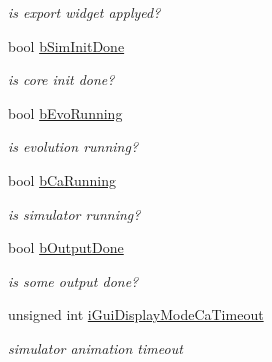 \begin{DoxyCompactItemize}
\begin{DoxyCompactList}\small\item\em is export widget applyed? \item\end{DoxyCompactList}\item 
\hypertarget{classCWindowMain_a9fb2c8acfb8cef14443738ebc7a57e40}{
bool \hyperlink{classCWindowMain_a9fb2c8acfb8cef14443738ebc7a57e40}{bSimInitDone}}
\label{classCWindowMain_a9fb2c8acfb8cef14443738ebc7a57e40}

\begin{DoxyCompactList}\small\item\em is core init done? \item\end{DoxyCompactList}\item 
\hypertarget{classCWindowMain_ab2f7ecd4403800b1ac1480a892c1f09e}{
bool \hyperlink{classCWindowMain_ab2f7ecd4403800b1ac1480a892c1f09e}{bEvoRunning}}
\label{classCWindowMain_ab2f7ecd4403800b1ac1480a892c1f09e}

\begin{DoxyCompactList}\small\item\em is evolution running? \item\end{DoxyCompactList}\item 
\hypertarget{classCWindowMain_a7f198e5218f09c31a2ee2da405a69482}{
bool \hyperlink{classCWindowMain_a7f198e5218f09c31a2ee2da405a69482}{bCaRunning}}
\label{classCWindowMain_a7f198e5218f09c31a2ee2da405a69482}

\begin{DoxyCompactList}\small\item\em is simulator running? \item\end{DoxyCompactList}\item 
\hypertarget{classCWindowMain_a67bdd53e50e369c7cc3831e591c0efb1}{
bool \hyperlink{classCWindowMain_a67bdd53e50e369c7cc3831e591c0efb1}{bOutputDone}}
\label{classCWindowMain_a67bdd53e50e369c7cc3831e591c0efb1}

\begin{DoxyCompactList}\small\item\em is some output done? \item\end{DoxyCompactList}\item 
\hypertarget{classCWindowMain_ae273a731f01b4c77bdd4c2c56fb0240a}{
unsigned int \hyperlink{classCWindowMain_ae273a731f01b4c77bdd4c2c56fb0240a}{iGuiDisplayModeCaTimeout}}
\label{classCWindowMain_ae273a731f01b4c77bdd4c2c56fb0240a}

\begin{DoxyCompactList}\small\item\em simulator animation timeout \item\end{DoxyCompactList}\end{DoxyCompactItemize}



